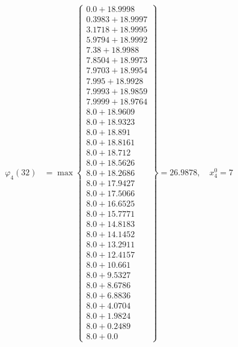 \documentclass{article}
\begin{document}
\begin{align*}
\varphi_{4}(32) &= \max \left\{ \begin{array}{c}
0.0 + 18.9998 \\
 0.3983 + 18.9997 \\
 3.1718 + 18.9995 \\
 5.9794 + 18.9992 \\
 7.38 + 18.9988 \\
 7.8504 + 18.9973 \\
 7.9703 + 18.9954 \\
 7.995 + 18.9928 \\
 7.9993 + 18.9859 \\
 7.9999 + 18.9764 \\
 8.0 + 18.9609 \\
 8.0 + 18.9323 \\
 8.0 + 18.891 \\
 8.0 + 18.8161 \\
 8.0 + 18.712 \\
 8.0 + 18.5626 \\
 8.0 + 18.2686 \\
 8.0 + 17.9427 \\
 8.0 + 17.5066 \\
 8.0 + 16.6525 \\
 8.0 + 15.7771 \\
 8.0 + 14.8183 \\
 8.0 + 14.1452 \\
 8.0 + 13.2911 \\
 8.0 + 12.4157 \\
 8.0 + 10.661 \\
 8.0 + 9.5327 \\
 8.0 + 8.6786 \\
 8.0 + 6.8836 \\
 8.0 + 4.0704 \\
 8.0 + 1.9824 \\
 8.0 + 0.2489 \\
 8.0 + 0.0
\end{array} \right\}=26.9878, \quad x_{4}^0=7\\
  

\end{align*}
\end{document}

